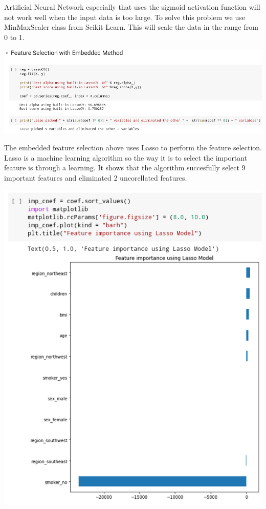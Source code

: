 \documentclass[a4paper, 12pt]{article}
\begin{document}
\begin{multicols}{2}
\justifying
Artificial Neural Network especially that uses the sigmoid activation function will not work well when the input data is too large. To solve this problem we use MinMaxScaler class from Scikit-Learn. \cite{sklearn_api} This will scale the data in the range from 0 to 1.

\centering
\vspace{0.2cm}
\includegraphics[scale=0.185]{feature_selection_1}
\vspace{0.2cm}

\justifying
The embedded feature selection above uses Lasso to perform the feature selection. Lasso is a machine learning algorithm so the way it is to select the important feature is through a learning. It shows that the algorithm succesfully select 9 important features and eliminated 2 uncorellated features.

\centering
\vspace{0.2cm}
\includegraphics[scale=0.33]{feature_selection_2}
\vspace{0.2cm}


\end{multicols}
\end{document}

